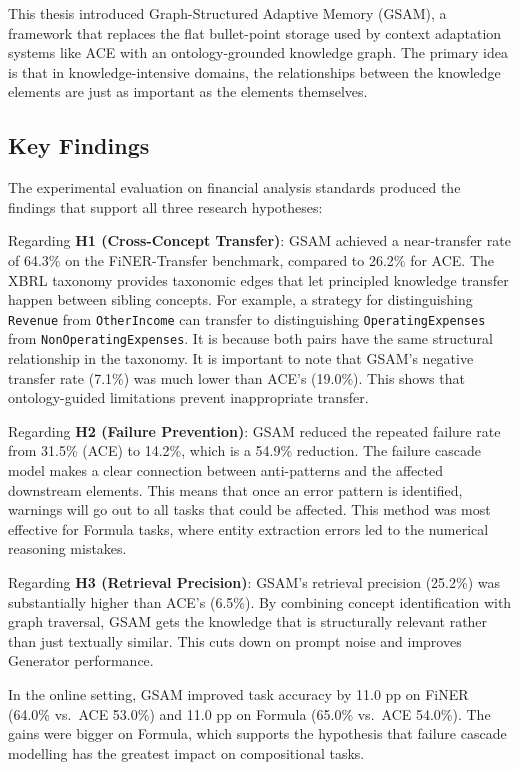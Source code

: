 \documentclass[12pt,a4paper,oneside]{article}
\begin{document}
This thesis introduced Graph-Structured Adaptive Memory (GSAM), a framework that replaces the flat bullet-point storage used by context adaptation systems like ACE with an ontology-grounded knowledge graph. The primary idea is that in knowledge-intensive domains, the relationships between the knowledge elements are just as important as the elements themselves.

\subsection{Key Findings}

The experimental evaluation on financial analysis standards produced the findings that support all three research hypotheses:

Regarding \textbf{H1 (Cross-Concept Transfer)}: GSAM achieved a near-transfer rate of 64.3\% on the FiNER-Transfer benchmark, compared to 26.2\% for ACE. The XBRL taxonomy provides taxonomic edges that let principled knowledge transfer happen between sibling concepts. For example, a strategy for distinguishing \texttt{Revenue} from \texttt{OtherIncome} can transfer to distinguishing \texttt{OperatingExpenses} from \texttt{NonOperatingExpenses}. It is because both pairs have the same structural relationship in the taxonomy. It is important to note that GSAM's negative transfer rate (7.1\%) was much lower than ACE's (19.0\%). This shows that ontology-guided limitations prevent inappropriate transfer.

Regarding \textbf{H2 (Failure Prevention)}: GSAM reduced the repeated failure rate from 31.5\% (ACE) to 14.2\%, which is a 54.9\% reduction. The failure cascade model makes a clear connection between anti-patterns and the affected downstream elements. This means that once an error pattern is identified, warnings will go out to all tasks that could be affected. This method was most effective for Formula tasks, where entity extraction errors led to the numerical reasoning mistakes.

Regarding \textbf{H3 (Retrieval Precision)}: GSAM's retrieval precision (25.2\%) was substantially higher than ACE's (6.5\%). By combining concept identification with graph traversal, GSAM gets the knowledge that is structurally relevant rather than just textually similar. This cuts down on prompt noise and improves Generator performance.

In the online setting, GSAM improved task accuracy by 11.0 pp on FiNER (64.0\% vs.\ ACE 53.0\%) and 11.0 pp on Formula (65.0\% vs.\ ACE 54.0\%). The gains were bigger on Formula, which supports the hypothesis that failure cascade modelling has the greatest impact on compositional tasks.
\end{document}
